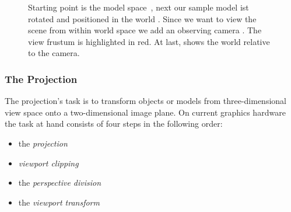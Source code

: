 \begin{figure}[t]
{  \label{fig:subfigviewspace}
}
\caption[Model, World and View space]{Starting point is the model
space~, next our sample model ist rotated and
positioned in the world . Since we want to view the
scene from within world space we add an observing camera
. The view frustum is highlighted in
red. At last,  shows the world relative to the
camera.}
\label{fig:ModelWorldView}
\end{figure}

\subsubsection{The Projection}

The projection's task is to transform objects or models from three-dimensional
view space onto a two-dimensional image plane. On current graphics hardware the
task at hand consists of four steps in the following order:
\begin{itemize}
 \item the \textit{projection}
 \item \textit{viewport clipping}
 \item the \textit{perspective division}
 \item the \textit{viewport transform}
\end{itemize}

